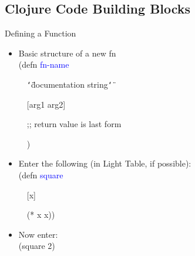 \documentclass{beamer}
\renewcommand{\textquotedbl}{\texttt{\char`\"}}
\begin{document}
\subsection{Clojure Code Building Blocks}

\begin{frame}{Defining a Function}
  \begin{itemize}[<+->]
  \item Basic structure of a new fn\\
{\ttfamily\color{black}
%
\textcolor[rgb]{0.54901963,0.54901963,0.54901963}{(}\textcolor[rgb]{0.49803922,0.0,0.49803922}{defn}
\textcolor{blue}{fn-name}}

{\ttfamily\color{black}
\ \ \textcolor[rgb]{0.54509807,0.13333334,0.32156864}{{\textquotedbl}documentation
string{\textquotedbl}}}

{\ttfamily\color{black}
\ \ [arg1 arg2]}

{\ttfamily\color{black}
\ \ \textcolor[rgb]{0.69803923,0.13333334,0.13333334}{;; return value is
last form}}

{\ttfamily\color{black}
\ \ \textcolor[rgb]{0.54901963,0.54901963,0.54901963}{)}}
  \item Enter the following (in Light Table, if possible):\\
{\ttfamily\color{black}
%
\textcolor[rgb]{0.54901963,0.54901963,0.54901963}{(}\textcolor[rgb]{0.49803922,0.0,0.49803922}{defn}
\textcolor{blue}{square}}

{\ttfamily\color{black}
\ \ [x]}

{\ttfamily\color{black}
\ \ \textcolor[rgb]{0.54901963,0.54901963,0.54901963}{(}\textcolor[rgb]{0.28235295,0.23921569,0.54509807}{*}
x x\textcolor[rgb]{0.54901963,0.54901963,0.54901963}{))}}
  \item Now enter:\\
{\ttfamily\color{black}
%
\textcolor[rgb]{0.54901963,0.54901963,0.54901963}{(}square
2\textcolor[rgb]{0.54901963,0.54901963,0.54901963}{)}}

  \end{itemize}
\end{frame}
\end{document}
